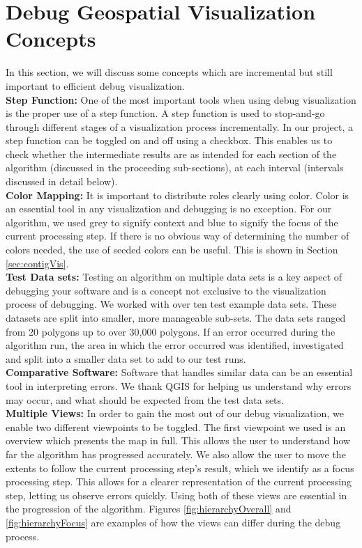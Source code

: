 \section{Debug Geospatial Visualization Concepts}
In this section, we will discuss some concepts which are incremental but still important to efficient debug visualization.
\\ \textbf{Step Function: }One of the most important tools when using debug visualization is the proper use of a step function. A step function is used to stop-and-go through different stages of a visualization process incrementally. In our project, a step function can be toggled on and off using a checkbox. This enables us to check whether the intermediate results are as intended for each section of the algorithm (discussed in the proceeding sub-sections), at each interval (intervals discussed in detail below). 
\\ \textbf{Color Mapping: }It is important to distribute roles clearly using color. Color is an essential tool in any visualization and debugging is no exception. For our algorithm, we used grey to signify context and blue to signify the focus of the current processing step. If there is no obvious way of determining the number of colors needed, the use of seeded colors can be useful. This is shown in Section \ref{sec:contigVis}.
\\ \textbf{Test Data sets: }Testing an algorithm on multiple data sets is a key aspect of debugging your software and is a concept not exclusive to the visualization process of debugging. We worked with over ten test example data sets. These datasets are split into smaller, more manageable sub-sets. The data sets ranged from 20 polygons up to over 30,000 polygons. If an error occurred during the algorithm run, the area in which the error occurred was identified, investigated and split into a smaller data set to add to our test runs.
\\ \textbf{Comparative Software: }Software that handles similar data can be an essential tool in interpreting errors. We thank QGIS \cite{qgis2015qgis} for helping us understand why errors may occur, and what should be expected from the test data sets.
\\ \textbf{Multiple Views: }In order to gain the most out of our debug visualization, we enable two different viewpoints to be toggled. The first viewpoint we used is an overview which presents the map in full. This allows the user to understand how far the algorithm has progressed accurately. We also allow the user to move the extents to follow the current processing step's result, which we identify as a focus processing step. This allows for a clearer representation of the current processing step, letting us observe errors quickly. Using both of these views are  essential in the progression of the algorithm. Figures \ref{fig:hierarchyOverall} and \ref{fig:hierarchyFocus} are examples of how the views can differ during the debug process.

